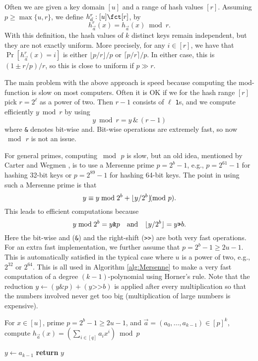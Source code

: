 Often we are given a key domain $[u]$ and a range of hash values $[r]$. Assuming $p\geq \max\{u,r\}$, we define
$h^r_{\vec a}:[u]\fct[r]$, by
\[h^r_{\vec a}(x)=h_{\vec a}(x)\bmod r.\]
With this definition, the hash values of $k$ distinct keys 
remain independent, but they are not exactly uniform. More
precisely, for any $i\in[r]$, we have that
$\Pr[h_{\vec a}^r(x)=i]$ is
either $\lfloor p/r\rfloor/p$ or $\lceil p/r\rceil/p$. In
either case, this is $(1\pm r/p)/r$, so this is close to uniform if
$p\gg r$.


The main problem with the above approach is speed because computing
the mod-function is slow on most computers. Often it
is OK if we for the hash range $[r]$ pick $r=2^\ell$ as a power of two.
Then $r-1$ consists of $\ell$ \texttt1s, and we compute efficiently
$y \bmod r$ by using 
\[y\bmod r=y\,\texttt\&\,(r-1)\]
where \texttt\& denotes bit-wise {\sc and}. Bit-wise operations are
extremely fast, so now $\bmod\,r$ is not an issue.

For general primes, computing $\bmod\,p$ is slow, but an old idea,
mentioned by Carter and Wegmen \cite{carter77universal}, is to use a
Mersenne prime $p=2^b-1$, e.g., $p=2^{61}-1$ for hashing 32-bit keys or
$p=2^{89}-1$ for hashing 64-bit keys. The point in using such a Mersenne prime
is that
\begin{equation}\label{eq:Mersenne}
y\equiv y\bmod 2^{b}+\floor{y/2^b}\ppmod {p}.
\end{equation}
This leads to efficient computations because 
\[y\bmod 2^{b}=y\texttt{\&}p\quad\textnormal{and}\quad\lfloor {y/2^b} \rfloor=y\texttt{>>}b.\]
Here the bit-wise {\sc and} (\texttt{\&}) and the right-shift (\texttt{>>}) are
both very fast operations. For
an extra fast implementation, we further assume that $p=2^b-1\geq 2u-1$.
This is automatically satisfied in the typical case where $u$ is a power
of two, e.g., $2^{32}$ or $2^{64}$. This is all used in Algorithm \ref{alg:Mersenne} to make a very fast
computation of a degree $(k-1)$-polynomial using Horner's rule. Note that
the reduction $y\gets (y\texttt\&p)+(y\texttt{>>}b)$ is applied after
every multiplication so that the numbers involved never get too big (multiplication of large numbers is expensive).
\begin{algorithm}\label{alg:Mersenne}
  \caption{For $x\in [u]$, prime $p=2^b-1\geq 2u-1$, and
    $\vec a=(a_0,\ldots,a_{k-1})\in[p]^k$, compute $h_{\vec a}(x)=\left(\sum_{i\in[q]}a_i x^i\right)\bmod p$}
$y\gets a_{k-1}$\;
{\bf return} $y$
\end{algorithm}

